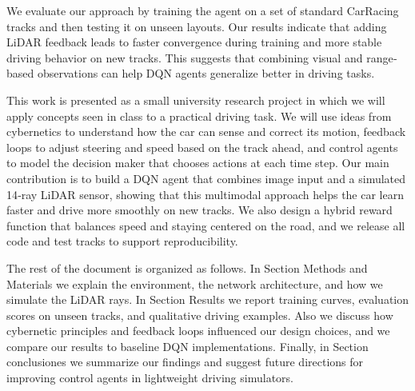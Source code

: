 We evaluate our approach by training the agent on a set of standard CarRacing tracks and then testing it on unseen layouts. Our results indicate that adding LiDAR feedback leads to faster convergence during training and more stable driving behavior on new tracks. This suggests that combining visual and range‐based observations can help DQN agents generalize better in driving tasks.

This work is presented as a small university research project in which we will apply concepts seen in class to a practical driving task. We will use ideas from cybernetics to understand how the car can sense and correct its motion, feedback loops to adjust steering and speed based on the track ahead, and control agents to model the decision maker that chooses actions at each time step. Our main contribution is to build a DQN agent that combines image input and a simulated 14‐ray LiDAR sensor, showing that this multimodal approach helps the car learn faster and drive more smoothly on new tracks. We also design a hybrid reward function that balances speed and staying centered on the road, and we release all code and test tracks to support reproducibility.

The rest of the document is organized as follows. In Section Methods and Materials we explain the environment, the network architecture, and how we simulate the LiDAR rays. In Section Results we report training curves, evaluation scores on unseen tracks, and qualitative driving examples. Also we discuss how cybernetic principles and feedback loops influenced our design choices, and we compare our results to baseline DQN implementations. Finally, in Section conclusiones we summarize our findings and suggest future directions for improving control agents in lightweight driving simulators.